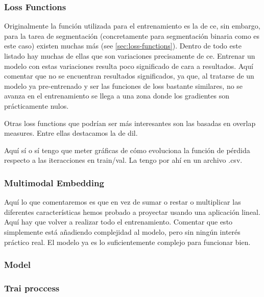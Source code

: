\subsubsection{Loss Functions}

Originalmente la función utilizada para el entrenamiento es la de \gls{ce}, sin
embargo, para la tarea de segmentación (concretamente para segmentación binaria
como es este caso) existen muchas más (see \vref{sec:loss-functions}). Dentro
de todo este listado hay muchas de ellas que son variaciones precisamente de
\gls{ce}. Entrenar un modelo con estas variaciones resulta poco significado de
cara a resultados. Aquí comentar que no se encuentran resultados significados,
ya que, al tratarse de un modelo ya pre-entrenado y ser las funciones de loss
bastante similares, no se avanza en el entrenamiento se llega a una zona donde
los gradientes son prácticamente nulos.

Otras loss functions que podrían ser más interesantes son las basadas en
overlap measures. Entre ellas destacamos la de \gls{dil}.


Aquí sí o sí tengo que meter gráficas de cómo evoluciona la función de pérdida
respecto a las iteracciones en train/val. La tengo por ahí en un archivo .csv.


\subsubsection{Multimodal Embedding}

Aquí lo que comentaremos es que en vez de sumar o restar o multiplicar las
diferentes características hemos probado a proyectar usando una aplicación
lineal. Aquí hay que volver a realizar todo el entrenamiento. Comentar que esto
simplemente está añadiendo complejidad al modelo, pero sin ningún interés
práctico real. El modelo ya es lo suficientemente complejo para funcionar
bien.


\subsubsection{Model}


\subsubsection{Trai proccess}



